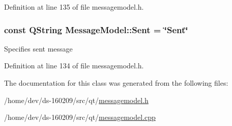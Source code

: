 Definition at line 135 of file messagemodel.\+h.

\hypertarget{class_message_model_ae5014d3052e4cec590f673d22edb9cd0}{}
\subsubsection[{Sent}]{\setlength{\rightskip}{0pt plus 5cm}const Q\+String Message\+Model\+::\+Sent = \char`\"{}Sent\char`\"{}\hspace{0.3cm}{\ttfamily [static]}}\label{class_message_model_ae5014d3052e4cec590f673d22edb9cd0}
Specifies sent message 

Definition at line 134 of file messagemodel.\+h.



The documentation for this class was generated from the following files\+:\begin{DoxyCompactItemize}
\item 
/home/dev/ds-\/160209/src/qt/\hyperlink{messagemodel_8h}{messagemodel.\+h}\item 
/home/dev/ds-\/160209/src/qt/\hyperlink{messagemodel_8cpp}{messagemodel.\+cpp}\end{DoxyCompactItemize}
